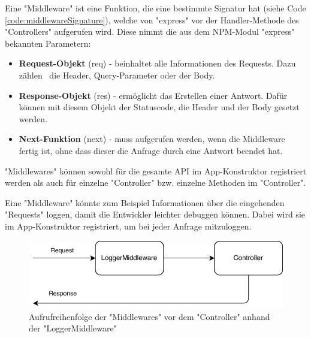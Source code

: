 \label{sec:middleware}

Eine "Middleware" ist eine Funktion, die eine bestimmte Signatur hat (siehe Code \ref{code:middlewareSignature}), welche von "express" vor der Handler-Methode des "Controllers" aufgerufen wird. 
Diese nimmt die aus dem NPM-Modul "express" bekannten Parametern:

    \begin{itemize}
        \item \textbf{Request-Objekt} ({\ttfamily req}) - beinhaltet alle Informationen des Requests. Dazu zählen \zb\ die Header, Query-Parameter oder der Body.
        \item \textbf{Response-Objekt} ({\ttfamily res}) - ermöglicht das Erstellen einer Antwort. Dafür können mit diesem Objekt der Statuscode, die Header und der Body gesetzt werden.
        \item \textbf{Next-Funktion} ({\ttfamily next}) - muss aufgerufen werden, wenn die Middleware fertig ist, ohne dass dieser die Anfrage durch eine Antwort beendet hat.
    \end{itemize}


"Middlewares" können sowohl für die gesamte API im App-Konstruktor registriert werden als auch für einzelne "Controller" bzw. einzelne Methoden im "Controller". 



Eine "Middleware" könnte zum Beispiel Informationen über die eingehenden "Requests" loggen, damit die Entwickler leichter debuggen können. 
Dabei wird sie im \linebreak App-Konstruktor registriert, um bei jeder Anfrage mitzuloggen. 

\begin{figure}[H]
    \centering
    \includegraphics{media/APITemplate/LogMiddleware.svg.pdf}
    \caption{Aufrufreihenfolge der "Middlewares" vor dem "Controller" anhand der "LoggerMiddleware"} 
\end{figure}

